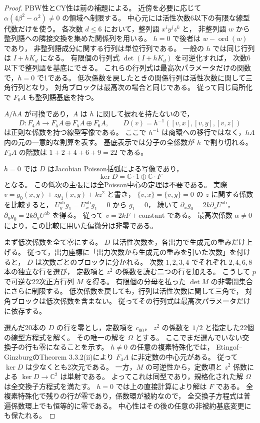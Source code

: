 \begin{proof}
PBW性とCY性は前の補題による。
近傍を必要に応じて $\alpha(4\beta^2-\alpha^2)\ne0$ の領域へ制限する。
中心元には活性次数6以下の有限な線型代数だけを使う。
各次数 $d\le6$ において，整列語 $x^iy^jz^k$ と，
非整列語 $w$ から整列語への隣接交換を集めた関係列を用いる。
$h=0$ で後者は $w-\operatorname{ord}(w)$ であり，
非整列語成分に関する行列は単位行列である。
一般の $h$ では同じ行列は $I+hK_d$ になる。
有限個の行列式 $\det(I+hK_d)$ を可逆化すれば，
次数6以下で整列語を基底にできる。
これらの行列式は最高次パラメータだけの関数で，$h=0$ で1である。
低次係数を戻したときの関係行列は活性次数に関して三角行列となり，
対角ブロックは最高次の場合と同じである。
従って同じ局所化で $F_6A$ も整列語基底を持つ。

$A/hA$ が可換であり，$A$ は $h$ に関して捩れを持たないので，
\[
 D:F_4A\longrightarrow F_5A\oplus F_5A\oplus F_6A,
 \qquad
 D(v)=h^{-1}([v,x],[v,y],[v,z])
\]
は正則な係数を持つ線型写像である。
ここで $h^{-1}$ は商環への移行ではなく，$hA$ 内の元の一意的な割算を表す。
基底表示では分子の全係数が $h$ で割り切れる。
$F_4A$ の階数は $1+2+4+6+9=22$ である。

$h=0$ では $D$ はJacobian Poisson括弧による写像であり，
\[
 \ker D=\mathbb C\cdot1\oplus\mathbb C\cdot F
\]
となる。
この低次の主張には全Poisson中心の定理は不要である。
実際 $v=g_0(x,y)+zg_1(x,y)+kz^2$ と書き，
$\{v,x\}=\{v,y\}=0$ の $z$ に関する係数を比較すると，
$U_y^{\mathrm{ab}}g_1=U_x^{\mathrm{ab}}g_1=0$ から $g_1=0$，
続いて $\partial_xg_0=2k\partial_xU^{\mathrm{ab}}$，
$\partial_yg_0=2k\partial_yU^{\mathrm{ab}}$ を得る。
従って $v=2kF+\text{constant}$ である。
最高次係数 $\alpha\ne0$ により，この比較に用いた偏微分は非零である。

まず低次係数を全て零にする。
$D$ は活性次数を，各出力で生成元の重みだけ上げる。
従って，出力座標に「出力次数から生成元の重みを引いた次数」を付けると，
$D$ は次数ごとのブロックに分かれる。
次数 $1,2,3,4$ でそれぞれ $2,4,6,8$ 本の独立な行を選び，
定数項と $z^2$ の係数を読む二つの行を加える。
こうして $p$ で可逆な22次正方行列 $M$ を得る。
有限個の分母を払った $\det M$ の非零開集合にさらに制限する。
低次係数を戻しても，行列は活性次数に関して三角で，
対角ブロックは低次係数を含まない。
従ってその行列式は最高次パラメータだけに依存する。

選んだ20本の $D$ の行を零とし，定数項を $c_{00}$，
$z^2$ の係数を $1/2$ と指定した22個の線型方程式を解く。
その唯一の解を $\Omega$ とする。
ここでまだ選んでいない交換子の行も零になることを示す。
$h\ne0$ の任意の複素特殊化では，
Etingof--GinzburgのTheorem 3.3.2(ii)により
$F_4A$ に非定数の中心元がある。
従って $\ker D$ は少なくとも2次元である。
一方，$M$ の可逆性から，定数項と $z^2$ 係数による
$\ker D\to\mathbb C^2$ は単射である。
よってこれは同型であり，規格化された解 $\Omega$ は全交換子方程式を満たす。
$h=0$ では上の直接計算により解は $F$ である。
全複素特殊化で残りの行が零であり，係数環が被約なので，
全交換子方程式は普遍係数環上でも恒等的に零である。
中心性はその後の任意の非被約基底変更にも保たれる。


\end{proof}
